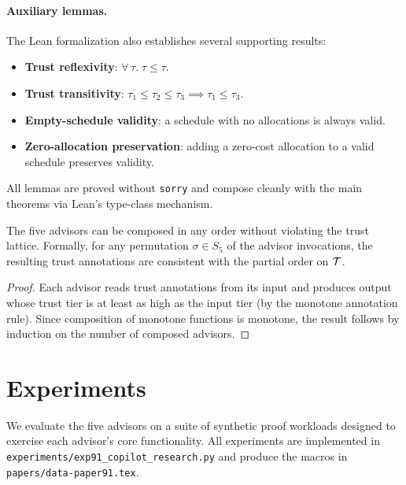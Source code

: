 \documentclass[11pt]{article}
\begin{document}
\paragraph{Auxiliary lemmas.}
The Lean formalization also establishes several supporting results:
\begin{itemize}
  \item \textbf{Trust reflexivity}: $\forall\, \tau.\;
        \tau \leq \tau$.
  \item \textbf{Trust transitivity}: $\tau_1 \leq \tau_2 \leq
        \tau_3 \implies \tau_1 \leq \tau_3$.
  \item \textbf{Empty-schedule validity}: a schedule with no
        allocations is always valid.
  \item \textbf{Zero-allocation preservation}: adding a
        zero-cost allocation to a valid schedule preserves
        validity.
\end{itemize}
All lemmas are proved without \texttt{sorry} and compose
cleanly with the main theorems via Lean's type-class mechanism.

\begin{proposition}\label{prop:composability}
The five advisors can be composed in any order without violating
the trust lattice.  Formally, for any permutation
$\sigma \in S_5$ of the advisor invocations, the resulting trust
annotations are consistent with the partial order on $\mathcal{T}$.
\end{proposition}
\begin{proof}
Each advisor reads trust annotations from its input and
produces output whose trust tier is at least as high as the
input tier (by the monotone annotation rule).  Since
composition of monotone functions is monotone, the result
follows by induction on the number of composed advisors.
\end{proof}

\section{Experiments}\label{sec:experiments}

We evaluate the five advisors on a suite of synthetic proof
workloads designed to exercise each advisor's core functionality.
All experiments are implemented in
\texttt{experiments/exp91\_copilot\_research.py} and produce the
macros in \texttt{papers/data-paper91.tex}.
\end{document}
